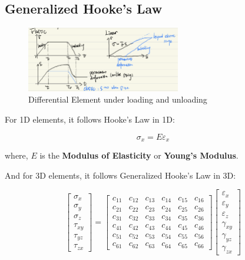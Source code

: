 \documentclass[en,hazy,cyan,8pt,normal]{elegantnote}
\numberwithin{equation}{section}
\begin{document}
  \subsection{Generalized Hooke's Law}\label{subsec:03.02}
    
    \begin{figure}[H]
      \centering
      \includegraphics[width=0.6\textwidth]{image/014.png}
      \caption{Differential Element under loading and unloading}
      \label{fig:014}
    \end{figure}

    For 1D elements, it follows Hooke's Law in 1D:

    \begin{equation}\label{eq:054}
      \sigma_x = E \varepsilon_x
    \end{equation}

    where, $E$ is the \textbf{Modulus of Elasticity} or \textbf{Young's Modulus}.

    And for 3D elements, it follows Generalized Hooke's Law in 3D:

    \begin{equation}\label{eq:055}
      \begin{bmatrix}
        \sigma_x \\
        \sigma_y \\
        \sigma_z \\
        \tau_{xy} \\
        \tau_{yz} \\
        \tau_{zx}
      \end{bmatrix}
      =
      \begin{bmatrix}
        c_{11} & c_{12} & c_{13} & c_{14} & c_{15} & c_{16} \\
        c_{21} & c_{22} & c_{23} & c_{24} & c_{25} & c_{26} \\
        c_{31} & c_{32} & c_{33} & c_{34} & c_{35} & c_{36} \\
        c_{41} & c_{42} & c_{43} & c_{44} & c_{45} & c_{46} \\
        c_{51} & c_{52} & c_{53} & c_{54} & c_{55} & c_{56} \\
        c_{61} & c_{62} & c_{63} & c_{64} & c_{65} & c_{66}
      \end{bmatrix}
      \begin{bmatrix}
        \varepsilon_x \\
        \varepsilon_y \\
        \varepsilon_z \\
        \gamma_{xy} \\
        \gamma_{yz} \\
        \gamma_{zx}
      \end{bmatrix}
    \end{equation}
\end{document}
